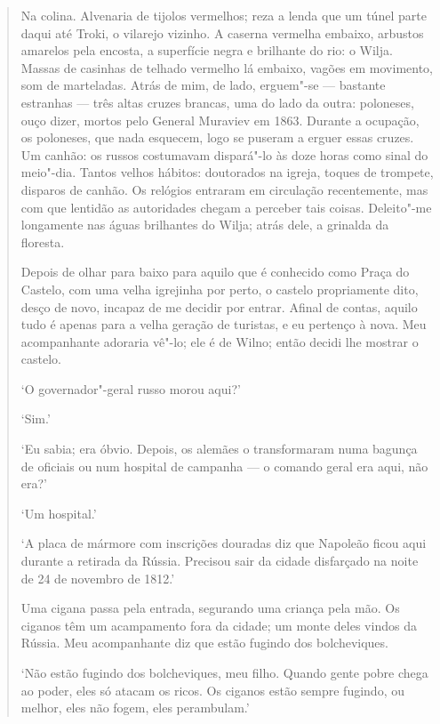 \begin{quote}
Na colina. Alvenaria de tijolos vermelhos; reza a lenda que um túnel
parte daqui até Troki, o vilarejo vizinho. A caserna vermelha embaixo,
arbustos amarelos pela encosta, a superfície negra e brilhante do rio: o
Wilja. Massas de casinhas de telhado vermelho lá embaixo, vagões em
movimento, som de marteladas. Atrás de mim, de lado, erguem"-se ---
bastante estranhas --- três altas cruzes brancas, uma do lado da outra:
poloneses, ouço dizer, mortos pelo General Muraviev em 1863. Durante a
ocupação, os poloneses, que nada esquecem, logo se puseram a erguer
essas cruzes. Um canhão: os russos costumavam dispará"-lo às doze horas
como sinal do meio"-dia. Tantos velhos hábitos: doutorados na igreja,
toques de trompete, disparos de canhão. Os relógios entraram em
circulação recentemente, mas com que lentidão as autoridades chegam a
perceber tais coisas. Deleito"-me longamente nas águas brilhantes do
Wilja; atrás dele, a grinalda da floresta.

Depois de olhar para baixo para aquilo que é conhecido como Praça do
Castelo, com uma velha igrejinha por perto, o castelo propriamente dito,
desço de novo, incapaz de me decidir por entrar. Afinal de contas,
aquilo tudo é apenas para a velha geração de turistas, e eu pertenço à
nova. Meu acompanhante adoraria vê"-lo; ele é de Wilno; então decidi lhe
mostrar o castelo.

`O governador"-geral russo morou aqui?'

`Sim.'

`Eu sabia; era óbvio. Depois, os alemães o transformaram numa bagunça de
oficiais ou num hospital de campanha --- o comando geral era aqui, não
era?'

`Um hospital.'

`A placa de mármore com inscrições douradas diz que Napoleão ficou aqui
durante a retirada da Rússia. Precisou sair da cidade disfarçado na
noite de 24 de novembro de 1812.'

Uma cigana passa pela entrada, segurando uma criança pela mão. Os
ciganos têm um acampamento fora da cidade; um monte deles vindos da
Rússia. Meu acompanhante diz que estão fugindo dos bolcheviques.

`Não estão fugindo dos bolcheviques, meu filho. Quando gente pobre chega
ao poder, eles só atacam os ricos. Os ciganos estão sempre fugindo, ou
melhor, eles não fogem, eles perambulam.'


\end{quote}
